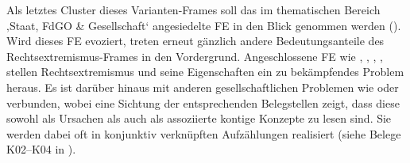 Als letztes Cluster dieses Varianten-Frames soll das im thematischen Bereich ‚Staat, FdGO \& Gesellschaft` angesiedelte FE  in den Blick genommen werden (). Wird dieses FE evoziert, treten erneut gänzlich andere Bedeutungsanteile des Rechtsextremismus-Frames in den Vordergrund. Angeschlossene FE wie , , , ,  stellen Rechtsextremismus und seine Eigenschaften ein zu bekämpfendes Problem heraus. Es ist darüber hinaus mit anderen gesellschaftlichen Problemen wie  oder  verbunden, wobei eine Sichtung der entsprechenden Belegstellen zeigt, dass diese sowohl als Ursachen als auch als assoziierte kontige Konzepte zu lesen sind. Sie werden dabei oft in konjunktiv verknüpften Aufzählungen realisiert (siehe Belege K02--K04 in ).

